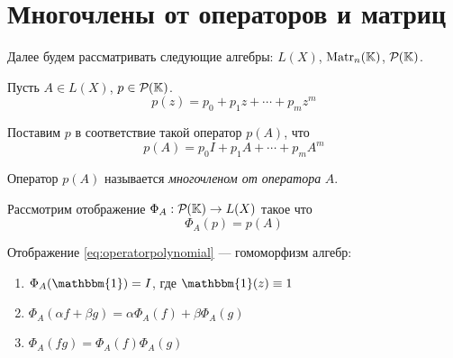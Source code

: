 \section{Многочлены от операторов и матриц}
Далее будем рассматривать следующие алгебры: $L(X)$, $\mathrm{Matr}_{n}({\mathbb{K}})$,
$\mathcal{P}_{}({\mathbb{K}})$.

Пусть $A \in L(X)$, $p \in \mathcal{P}_{}({\mathbb{K}})$.
\[ p(z) = p_0 + p_1 z + \dotsb + p_m z^m \]

Поставим $p$ в соответствие такой оператор $p(A)$, что
\[ p(A) = p_0 I + p_1 A + \dotsb + p_m A^m \]

\begin{definition}
    Оператор $p(A)$ называется \emph{многочленом от оператора} $A$.
\end{definition}

Рассмотрим отображение $ \Phi_A : \mathcal{P}_{}({\mathbb{K}}) \to L(X) $ такое что
\begin{equation}\label{eq:operatorpolynomial}
    \Phi_A(p) = p(A) 
\end{equation}

\begin{lemma}
    Отображение \eqref{eq:operatorpolynomial} — гомоморфизм алгебр:
    \begin{enumerate}
        \item $\Phi_A(\mathbbm{1}) = I$, где $\mathbbm{1}(z) \equiv 1$
        \item $\Phi_A(\alpha f + \beta g) = \alpha \Phi_A(f) + \beta \Phi_A(g)$
        \item $\Phi_A(fg) = \Phi_A(f) \Phi_A(g)$
    \end{enumerate}
\end{lemma}


